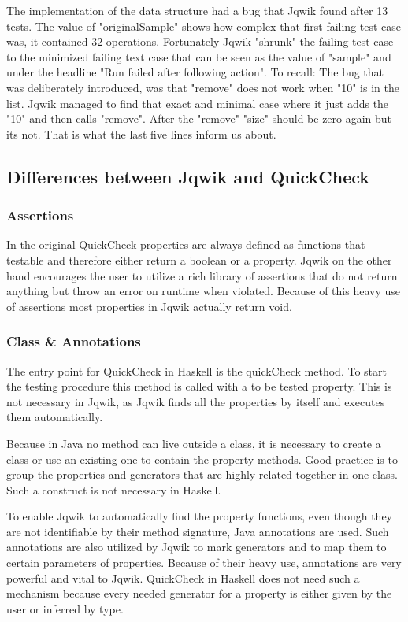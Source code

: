 \documentclass[a4paper, 12pt]{article} %
\begin{document}
The implementation of the data structure had a bug that Jqwik found after 13 tests. The value of "originalSample" shows how complex that first failing test case was, it contained 32 operations. Fortunately Jqwik "shrunk" the failing test case to the minimized failing text case that can be seen as the value of "sample" and under the headline "Run failed after following action". To recall: The bug that was deliberately introduced, was that "remove" does not work when "10" is in the list. Jqwik managed to find that exact and minimal case where it just adds the "10" and then calls "remove". After the "remove" "size" should be zero again but its not. That is what the last five lines inform us about.

\subsection{Differences between Jqwik and QuickCheck}

\subsubsection{Assertions}

In the original QuickCheck properties are always defined as functions that testable and therefore either return a boolean or a property. Jqwik on the other hand encourages the user to utilize a rich library of assertions that do not return anything but throw an error on runtime when violated. Because of this heavy use of assertions most properties in Jqwik actually return void.

\subsubsection{Class \& Annotations}

The entry point for QuickCheck in Haskell is the quickCheck method. To start the testing procedure this method is called with a to be tested property. This is not necessary in Jqwik, as Jqwik finds all the properties by itself and executes them automatically. 

Because in Java no method can live outside a class, it is necessary to create a class or use an existing one to contain the property methods. Good practice is to group the properties and generators that are highly related together in one class. Such a construct is not necessary in Haskell.

To enable Jqwik to automatically find the property functions, even though they are not identifiable by their method signature, Java annotations are used. Such annotations are also utilized by Jqwik to mark generators and to map them to certain parameters of properties. Because of their heavy use, annotations are very powerful and vital to Jqwik. QuickCheck in Haskell does not need such a mechanism because every needed generator for a property is either given by the user or inferred by type.
\end{document}
